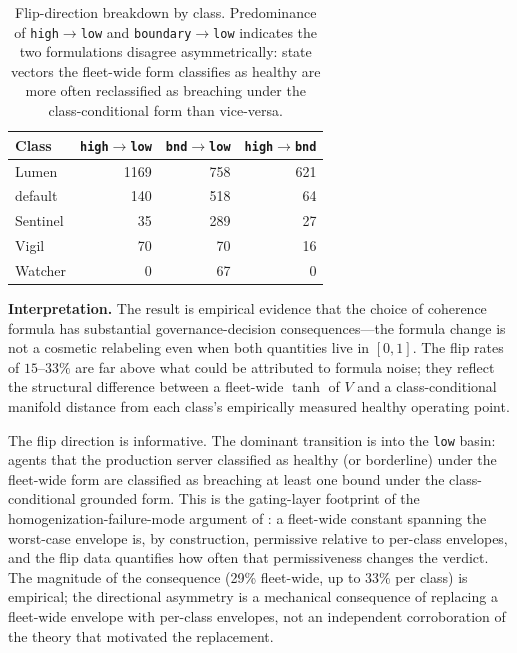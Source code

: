 \documentclass[11pt,twocolumn]{article}
\begin{document}
\begin{table}[t]
\centering\small
\caption{Flip-direction breakdown by class. Predominance of
\texttt{high$\to$low} and \texttt{boundary$\to$low} indicates the
two formulations disagree asymmetrically: state vectors the
fleet-wide form classifies as healthy are more often reclassified
as breaching under the class-conditional form than vice-versa.}
\label{tab:flip-directions}
\begin{tabular}{@{}lrrr@{}}
\toprule
\textbf{Class} & \texttt{high$\to$low} & \texttt{bnd$\to$low} & \texttt{high$\to$bnd} \\
\midrule
Lumen     & 1169 & 758 & 621 \\
default   &  140 & 518 &  64 \\
Sentinel  &   35 & 289 &  27 \\
Vigil     &   70 &  70 &  16 \\
Watcher   &    0 &  67 &   0 \\
\bottomrule
\end{tabular}
\end{table}

\textbf{Interpretation.} The result is empirical evidence that the
choice of coherence formula has substantial governance-decision
consequences---the formula change is not a cosmetic relabeling
even when both quantities live in $[0,1]$. The flip rates of
$15$--$33\%$ are far above what could be attributed to formula
noise; they reflect the structural difference between a fleet-wide
$\tanh$ of $V$ and a class-conditional manifold distance from each
class's empirically measured healthy operating point.

The flip direction is informative. The dominant transition is into
the \texttt{low} basin: agents that the production server
classified as healthy (or borderline) under the fleet-wide form
are classified as breaching at least one bound under the
class-conditional grounded form. This is the gating-layer
footprint of the homogenization-failure-mode argument of
: a fleet-wide constant spanning the
worst-case envelope is, by construction, permissive relative to
per-class envelopes, and the flip data quantifies how often that
permissiveness changes the verdict. The magnitude of the
consequence (29\% fleet-wide, up to 33\% per class) is empirical;
the directional asymmetry is a mechanical consequence of
replacing a fleet-wide envelope with per-class envelopes, not an
independent corroboration of the theory that motivated the
replacement.
\end{document}
